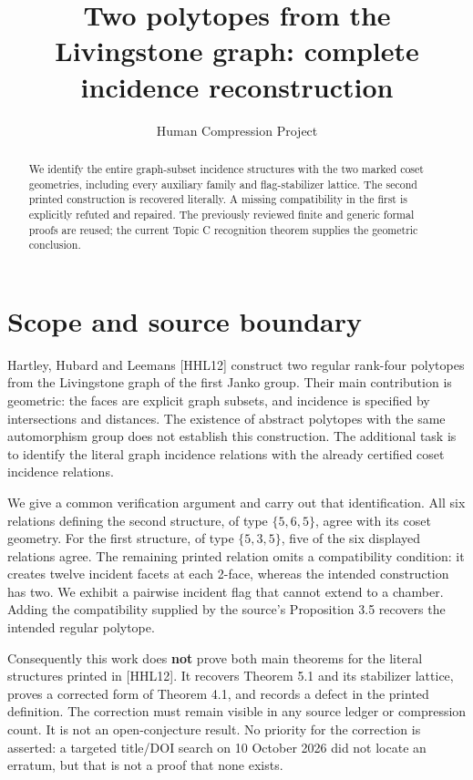 
\title{Two polytopes from the Livingstone graph: complete incidence reconstruction}
\author{Human Compression Project}\date{}
\maketitle
\begin{abstract}
We identify the entire graph-subset incidence structures with the two marked coset geometries, including every auxiliary family and flag-stabilizer lattice. The second printed construction is recovered literally. A missing compatibility in the first is explicitly refuted and repaired. The previously reviewed finite and generic formal proofs are reused; the current Topic C recognition theorem supplies the geometric conclusion.
\end{abstract}
\section{Scope and source boundary}\label{scope-and-source-boundary}

Hartley, Hubard and Leemans {[}HHL12{]} construct two regular rank-four
polytopes from the Livingstone graph of the first Janko group. Their
main contribution is geometric: the faces are explicit graph subsets,
and incidence is specified by intersections and distances. The existence
of abstract polytopes with the same automorphism group does not
establish this construction. The additional task is to identify the
literal graph incidence relations with the already certified coset
incidence relations.

We give a common verification argument and carry out that
identification. All six relations defining the second structure, of type
\(\{5,6,5\}\), agree with its coset geometry. For the first structure,
of type \(\{5,3,5\}\), five of the six displayed relations agree. The
remaining printed relation omits a compatibility condition: it creates
twelve incident facets at each 2-face, whereas the intended construction
has two. We exhibit a pairwise incident flag that cannot extend to a
chamber. Adding the compatibility supplied by the source's Proposition
3.5 recovers the intended regular polytope.

Consequently this work does \textbf{not} prove both main theorems for
the literal structures printed in {[}HHL12{]}. It recovers Theorem 5.1
and its stabilizer lattice, proves a corrected form of Theorem 4.1, and
records a defect in the printed definition. The correction must remain
visible in any source ledger or compression count. It is not an
open-conjecture result. No priority for the correction is asserted: a
targeted title/DOI search on 10 October 2026 did not locate an erratum,
but that is not a proof that none exists.

